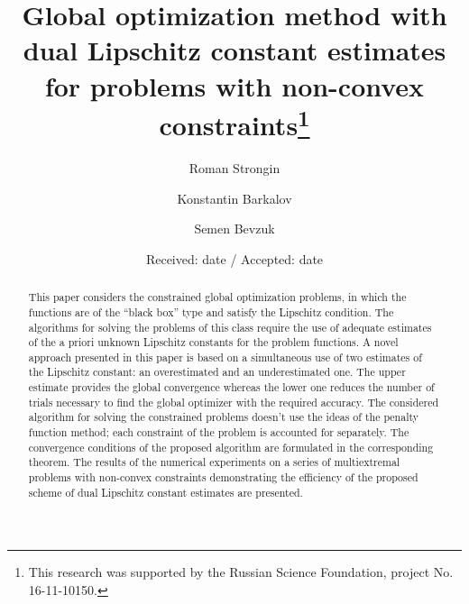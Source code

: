\documentclass[twocolumn]{svjour3}          %
\begin{document}

\title{Global optimization method with dual Lipschitz constant estimates for problems with non-convex constraints\thanks{This research was supported by the Russian Science Foundation, project No. 16-11-10150.}
}

\author{Roman Strongin        \and
        Konstantin Barkalov   \and
				Semen Bevzuk
}


\date{Received: date / Accepted: date}


\maketitle

\begin{abstract}
This paper considers the constrained global optimization problems, in which the functions are of the “black box” type and satisfy the Lipschitz condition. The algorithms for solving the problems of this class require the use of adequate estimates of the a priori unknown Lipschitz constants for the problem functions. A novel approach presented in this paper is based on a simultaneous use of two estimates of the Lipschitz constant: an overestimated and an underestimated one. The upper estimate provides the global convergence whereas the lower one reduces the number of trials necessary to find the global optimizer with the required accuracy. The considered algorithm for solving the constrained problems doesn't use the ideas of the penalty function method; each constraint of the problem is accounted for separately. The convergence conditions of the proposed algorithm are formulated in the corresponding theorem. The results of the numerical experiments on a series of multiextremal problems with non-convex constraints demonstrating the efficiency of the proposed scheme of dual Lipschitz constant estimates are presented.
\end{abstract}
\end{document}

